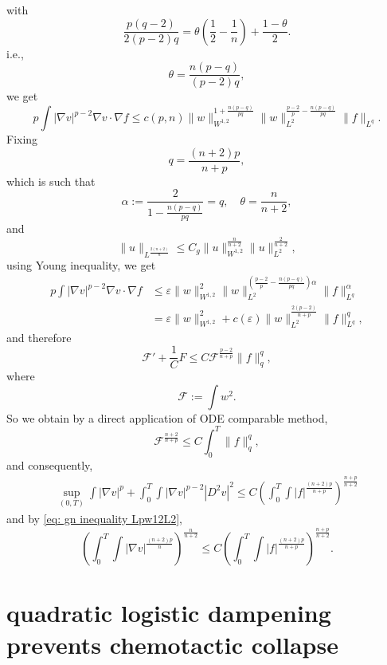 with
\[
	\frac{p(q-2)}{2(p-2)q} = \theta\left(\frac12-\frac1n\right) + \frac{1-\theta}{2}.
\]
i.e.,
\[
	\theta = \frac{n(p-q)}{(p-2)q},
\]
we get
\begin{equation*}
	p\int |\nabla v|^{p-2}\nabla v \cdot \nabla f 
	\leq c(p,n) \|w\|_{W^{1,2}}^{1+\frac{n(p-q)}{pq}}
		\|w\|_{L^2}^{\frac{p-2}{p} - \frac{n(p-q)}{pq}}
		\|f\|_{L^q}.
\end{equation*}
Fixing 
\[
	q = \frac{(n+2)p}{n+p},
\]
which is such that
\[
	\alpha := \frac{2}{1-\frac{n(p-q)}{pq}} = q,\quad \theta = \frac{n}{n+2},
\]
and 
\begin{equation}\label{eq: gn inequality Lpw12L2}
	\|u\|_{L^{\frac{2(n+2)}{n}}} \leq C_g \|u\|_{W^{1,2}}^{\frac{n}{n+2}}\|u\|_{L^2}^{\frac{2}{n+2}},
\end{equation}
using Young inequality, we get
\begin{align*}
	p\int |\nabla v|^{p-2}\nabla v \cdot \nabla f 
	&\leq \varepsilon \|w\|_{W^{1,2}}^2
		\|w\|_{L^2}^{\left(\frac{p-2}{p} - \frac{n(p-q)}{pq}\right)\alpha}
		\|f\|_{L^q}^\alpha\\
	&= \varepsilon \|w\|_{W^{1,2}}^2
	+ c(\varepsilon) \|w\|_{L^2}^{\frac{2(p-2)}{n+p}}
	\|f\|_{L^q}^q,
\end{align*}
and therefore
\begin{equation*}
	\mathcal{F}' + \frac1C F \leq C \mathcal{F}^{\frac{p-2}{n+p}} \|f\|_q^q, 
\end{equation*} 
where
\[
	\mathcal{F} := \int w^2.
\]
So we obtain by a direct application of ODE comparable method,
\[
	\mathcal{F}^{\frac{n+2}{n+p}} \leq C \int_0^T\|f\|_q^q,
\]
and consequently,
\begin{align*}
	\sup_{(0,T)}\int |\nabla v|^p + \int_0^T\int |\nabla v|^{p-2}|D^2 v|^2 
	\leq C \left(\int_0^T\int |f|^{\frac{(n+2)p}{n+p}}\right)^{\frac{n+p}{n+2}}
\end{align*}
and by \eqref{eq: gn inequality Lpw12L2},
\begin{equation*}
	\left(\int_0^T\int |\nabla v|^{\frac{(n+2)p}{n}}\right)^{\frac{n}{n+2}} 
	\leq C \left(\int_0^T\int |f|^{\frac{(n+2)p}{n+p}}\right)^{\frac{n+p}{n+2}}. 
\end{equation*}

\section{quadratic logistic dampening prevents chemotactic collapse}